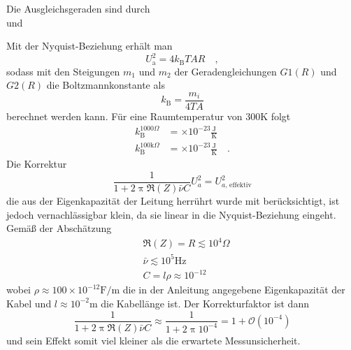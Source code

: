 		Die Ausgleichsgeraden sind durch
		\begin{equation}
			
		\end{equation}
		und
		\begin{equation}
			
		\end{equation}

		Mit der Nyquist-Beziehung erhält man
		\begin{equation}
			U_\text{a}^2 =4k_\text{B}T A R \quad ,
		\end{equation}
		sodass mit den Steigungen $m_1$ und $m_2$ der Geradengleichungen $G1(R)$ und $G2(R)$
		die Boltzmannkonstante als
		\begin{equation}
		k_\text{B}=\frac{m_i}{4 T A}
		\end{equation}
		berechnet werden kann. Für eine Raumtemperatur von $300$K folgt
		\begin{align}
          k_\text{B}^{1000\Omega}			&=  \times 10^{-23}\frac{\text{J}}
																			{\text{K}}  \\
                                                                            k_\text{B}^{100\text{k}\Omega}	&=  \times 10^{-23}\frac{\text{J}}
																			{\text{K}} \quad .
		\end{align}
		Die Korrektur
		\begin{equation}
		\frac{1}{1+2 \uppi \Re(Z) \bar{\nu} C} U_a^2 = U_{a\text{, effektiv}}^2
		\end{equation}
		die aus der Eigenkapazität der Leitung herrührt wurde mit berücksichtigt, ist
		jedoch vernachlässigbar klein, da
		sie linear in die Nyquist-Beziehung eingeht. Gemäß der Abschätzung
		\begin{align}
		&\Re(Z) = R  \lesssim  10^4 \Omega \\
		&\bar{\nu}  \lesssim 10^5 \text{Hz} \\
		&C = l \rho  \approx 10^{-12}
		\end{align}
		wobei $\rho\approx 100 \times 10^{-12} \text{F}/\text{m}$ die in
		der Anleitung angegebene Eigenkapazität der Kabel
		und $l\approx 10^{-2}$m die Kabellänge ist. Der Korrekturfaktor ist dann
		\begin{equation}
		\frac{1}{1+2 \uppi \Re(Z) \bar{\nu} C} \approx
		\frac{1}{1+2\uppi 10^{-4}}=1+ \mathcal{O}(10^{-4})
		\end{equation}
		und sein Effekt somit viel kleiner als die erwartete Messunsicherheit.

